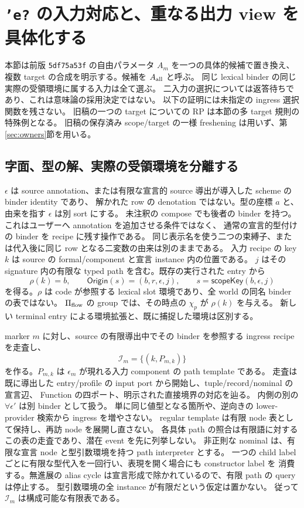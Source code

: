 \documentclass[11pt,a4paper]{article}
\begin{document}
\section{\texttt{'e?} の入力対応と、重なる出力 view を具体化する}
\label{sec:release-closed}

本節は前版 \texttt{5df75a53f} の自由パラメータ \(A_m\) を一つの具体的候補で置き換え、
複数 target の合成を明示する。候補を \(A_{\rm all}\) と呼ぶ。
同じ lexical binder の同じ実際の受領環境に属する入力は全て選ぶ。
二入力の選択については返答待ちであり、これは意味論の採用決定ではない。
以下の証明には未指定の ingress 選択関数を残さない。
旧稿の一つの target についての RP は本節の多 target 規則の特殊例となる。
旧稿の保存済み scope/target の一様 freshening は用いず、第\ref{sec:owners}節を用いる。

\subsection{字面、型の解、実際の受領環境を分離する}

\(\epsilon\) は source annotation、または有限な宣言的 source 導出が導入した scheme の
binder identity であり、
解かれた row の denotation ではない。型の座標 \(a\) と、由来を指す \(\epsilon\) は別 sort にする。
未注釈の compose でも後者の binder を持つ。これはユーザーへ annotation を追加させる条件ではなく、
通常の宣言的型付けの binder を recipe に残す操作である。
同じ表示名を使う二つの束縛子、または代入後に同じ row となる二変数の由来は別のままである。
入力 recipe の key \(k\) は source の formal/component と宣言 instance 内の位置である。
\(j\) はその signature 内の有限な typed path を含む。既存の実行された entry から
\[
 \rho(k)=b,\qquad \mathsf{Origin}(s)=(b,r,\epsilon,j),\qquad
 s=\mathsf{scopeKey}(b,\epsilon,j)
 \tag{R-Origin}
\]
を得る。\(\rho\) は code が参照する lexical slot 環境であり、全 world の同名 binder の表ではない。
\(\Pi_{\rm flow}\) の group では、その時点の \(\chi_p\) が \(\rho(k)\) を与える。
新しい terminal entry による環境拡張と、既に捕捉した環境は区別する。

marker \(m\) に対し、source の有限導出中でその binder を参照する ingress recipe を走査し、
\[
 \mathcal I_m=\{(k,P_{m,k})\}
 \tag{R-Inputs}
\]
を作る。\(P_{m,k}\) は \(\epsilon_m\) が現れる入力 component の path template である。
走査は既に導出した entry/profile の input port から開始し、tuple/record/nominal の宣言辺、
Function の四ポート、明示された直接境界の対応を辿る。
内側の別の \(\forall\epsilon'\) は別 binder として扱う。
単に同じ値型となる箇所や、逆向きの lower-provider 検索から ingress を増やさない。
regular template は有限 node 表として保持し、再訪 node を展開し直さない。
各具体 path の照合は有限語に対するこの表の走査であり、潜在 event を先に列挙しない。
非正則な nominal は、有限な宣言 node と型引数環境を持つ path interpreter とする。
一つの child label ごとに有限な型代入を一回行い、表現を開く場合にも constructor label を
消費する。無進展の alias cycle は宣言形成で除かれているので、有限 path の query は停止する。
型引数環境の全 instance が有限だという仮定は置かない。
従って \(\mathcal I_m\) は構成可能な有限表である。
\end{document}
